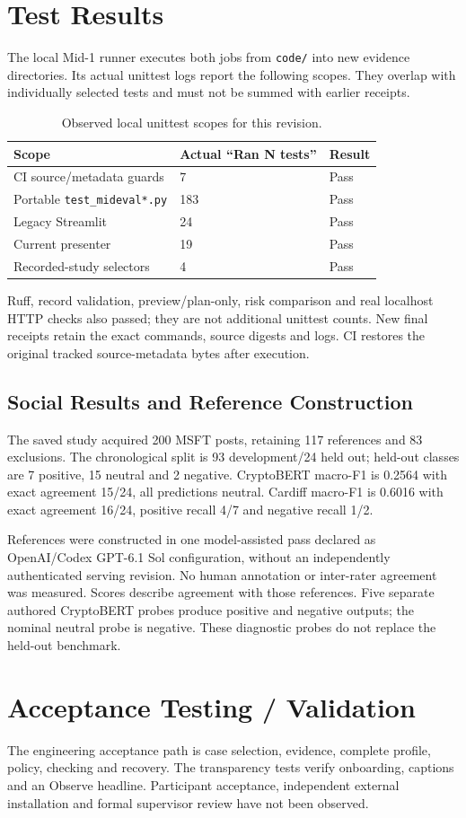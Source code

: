 \section{Test Results}
The local Mid-1 runner executes both jobs from \nolinkurl{code/} into new evidence directories. Its actual unittest logs report the following scopes. They overlap with individually selected tests and must not be summed with earlier receipts.
\begin{longtable}{p{}p{}p{}}
\caption{Observed local unittest scopes for this revision.}\label{tab:test-counts}\\\toprule Scope & Actual ``Ran N tests'' & Result\\\midrule
CI source/metadata guards & 7 & Pass\\
Portable \nolinkurl{test_mideval*.py} & 183 & Pass\\
Legacy Streamlit & 24 & Pass\\
Current presenter & 19 & Pass\\
Recorded-study selectors & 4 & Pass\\
\bottomrule\end{longtable}
Ruff, record validation, preview/plan-only, risk comparison and real localhost HTTP checks also passed; they are not additional unittest counts. New final receipts retain the exact commands, source digests and logs. CI restores the original tracked source-metadata bytes after execution.
\subsection{Social Results and Reference Construction}
The saved study acquired 200 MSFT posts, retaining 117 references and 83 exclusions. The chronological split is 93 development/24 held out; held-out classes are 7 positive, 15 neutral and 2 negative. CryptoBERT macro-F1 is 0.2564 with exact agreement 15/24, all predictions neutral. Cardiff macro-F1 is 0.6016 with exact agreement 16/24, positive recall 4/7 and negative recall 1/2.

References were constructed in one model-assisted pass declared as OpenAI/Codex GPT-6.1 Sol configuration, without an independently authenticated serving revision. No human annotation or inter-rater agreement was measured. Scores describe agreement with those references. Five separate authored CryptoBERT probes produce positive and negative outputs; the nominal neutral probe is negative. These diagnostic probes do not replace the held-out benchmark.
\section{Acceptance Testing / Validation}
The engineering acceptance path is case selection, evidence, complete profile, policy, checking and recovery. The transparency tests verify onboarding, captions and an Observe headline. Participant acceptance, independent external installation and formal supervisor review have not been observed.
